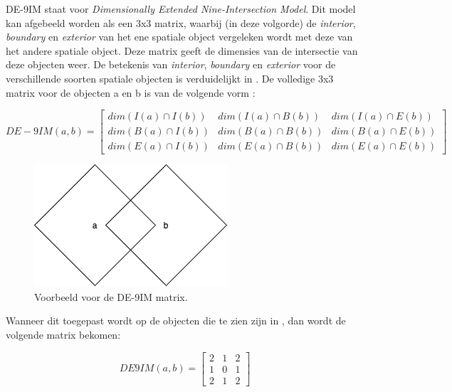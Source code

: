 DE-9IM staat voor \textit{Dimensionally Extended Nine-Intersection Model}. Dit model kan afgebeeld worden als een 3x3 matrix, waarbij (in deze volgorde) de \textit{interior}, \textit{boundary} en \textit{exterior} van het ene spatiale object vergeleken wordt met deze van het andere spatiale object. Deze matrix geeft de dimensies van de intersectie van deze objecten weer. De betekenis van \textit{interior}, \textit{boundary} en \textit{exterior} voor de verschillende soorten spatiale objecten is verduidelijkt in . De volledige 3x3 matrix voor de objecten a en b is van de volgende vorm \cite{shen2018classification}:

\begin{equation*}
    DE-9IM(a,b) = 
    \begin{bmatrix}
    dim(I(a)\cap I(b)) & dim(I(a)\cap B(b)) & dim(I(a)\cap E(b))\\
    dim(B(a)\cap I(b)) & dim(B(a)\cap B(b)) & dim(B(a)\cap E(b))\\
    dim(E(a)\cap I(b)) & dim(E(a)\cap B(b)) & dim(E(a)\cap E(b))
    \end{bmatrix}
\end{equation*}

\begin{figure}[ht]
    \centering
    \includegraphics[width=0.5\linewidth]{images/de-9im_example.png}
    \caption{Voorbeeld voor de DE-9IM matrix.}
    \label{fig:de-9im_example}
\end{figure}

Wanneer dit toegepast wordt op de objecten die te zien zijn in , dan wordt de volgende matrix bekomen:

\begin{equation*}
    DE9IM(a,b) = 
    \begin{bmatrix}
    2 & 1 & 2\\
    1 & 0 & 1\\
    2 & 1 & 2
    \end{bmatrix}
\end{equation*}

